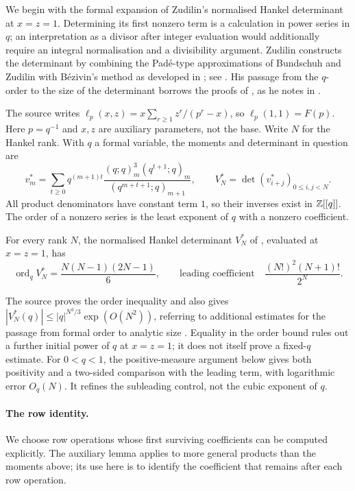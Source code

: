 \documentclass[11pt]{article}
\begin{document}
We begin with the formal expansion of Zudilin's normalised Hankel
determinant at $x=z=1$. Determining its first nonzero term is a
calculation in power series in $q$; an interpretation as a divisor
after integer evaluation would additionally require an integral
normalisation and a divisibility argument. Zudilin constructs the
determinant by combining the Pad\'e-type approximations of Bundschuh
and Zudilin \cite{bundschuhzudilin2008} with B\'ezivin's method as developed
in \cite{krvz2009}; see \cite[Sec.~2, p.~3]{zudilin2016}.  His passage from the
$q$-order to the size of the determinant borrows the proofs of
\cite[Lemma~2, p.~12, and Prop.~3, p.~13]{krvz2009}, as he notes in
\cite[Sec.~4, p.~7]{zudilin2016}.

The source writes $\ell_p(x,z)=x\sum_{r\ge1}z^r/(p^r-x)$, so
$\ell_p(1,1)=F(p)$. Here $p=q^{-1}$ and $x,z$ are auxiliary
parameters, not the base. Write $N$ for the Hankel rank. With $q$ a
formal variable, the moments and determinant in question are
\[
 v_m^*=\sum_{t\ge0}q^{(m+1)t}
       \frac{(q;q)_m^3(q^{t+1};q)_m}{(q^{m+t+1};q)_{m+1}},
 \qquad V_N^*=\det(v_{i+j}^*)_{0\le i,j<N}.
\]
All product denominators have constant term $1$, so their inverses
exist in $\mathbb{Z}[[q]]$. The order of a nonzero series is the least
exponent of $q$ with a nonzero coefficient.

\begin{theorem}\label{long1049:res:zudilin-sharp-qorder}
For every rank $N$, the normalised Hankel determinant $V_N^{*}$ of
\cite[Sec.~4, (6), p.~6]{zudilin2016}, evaluated at $x=z=1$, has
\[
 \operatorname{ord}_q V_N^{*}=\frac{N(N-1)(2N-1)}{6},
 \qquad
 \text{leading coefficient}\quad\frac{(N!)^{2}(N+1)!}{2^{N}} .
\]
\end{theorem}

\noindent The source proves the order inequality and also gives
$|V_N^*(q)|\le |q|^{N^3/3}\exp(O(N^2))$, referring to additional estimates
for the passage from formal order to analytic size
\cite[Sec.~4, p.~7]{zudilin2016}.
Equality in the order bound rules out a further initial power of $q$ at
$x=z=1$; it does not itself prove a fixed-$q$ estimate.
For $0<q<1$, the positive-measure argument below gives both positivity
and a two-sided comparison with the leading term, with logarithmic error
$O_q(N)$. It refines the subleading control, not the cubic exponent of $q$.

\paragraph{The row identity.}
We choose row operations whose first surviving coefficients can be
computed explicitly. The auxiliary lemma applies to more general
products than the moments above; its use here is to identify the
coefficient that remains after each row operation.
\end{document}
